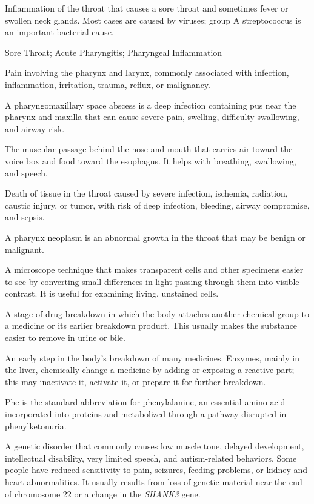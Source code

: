  Inflammation of the throat that causes a sore throat and sometimes fever or swollen neck glands. Most cases are caused by viruses; group A streptococcus is an important bacterial cause.

\synonyms
Sore Throat; Acute Pharyngitis; Pharyngeal Inflammation

 Pain involving the pharynx and larynx, commonly associated with infection, inflammation, irritation, trauma, reflux, or malignancy.

 A pharyngomaxillary space abscess is a deep infection containing pus near the pharynx and maxilla that can cause severe pain, swelling, difficulty swallowing, and airway risk.

 The muscular passage behind the nose and mouth that carries air toward the voice box and food toward the esophagus. It helps with breathing, swallowing, and speech.

 Death of tissue in the throat caused by severe infection, ischemia, radiation, caustic injury, or tumor, with risk of deep infection, bleeding, airway compromise, and sepsis.

 A pharynx neoplasm is an abnormal growth in the throat that may be benign or malignant.

 A microscope technique that makes transparent cells and other specimens easier to see by converting small differences in light passing through them into visible contrast. It is useful for examining living, unstained cells.

 A stage of drug breakdown in which the body attaches another chemical group to a medicine or its earlier breakdown product. This usually makes the substance easier to remove in urine or bile.

 An early step in the body’s breakdown of many medicines. Enzymes, mainly in the liver, chemically change a medicine by adding or exposing a reactive part; this may inactivate it, activate it, or prepare it for further breakdown.

 Phe is the standard abbreviation for phenylalanine, an essential amino acid incorporated into proteins and metabolized through a pathway disrupted in phenylketonuria.

 A genetic disorder that commonly causes low muscle tone, delayed development, intellectual disability, very limited speech, and autism-related behaviors. Some people have reduced sensitivity to pain, seizures, feeding problems, or kidney and heart abnormalities. It usually results from loss of genetic material near the end of chromosome 22 or a change in the \textit{SHANK3} gene.

